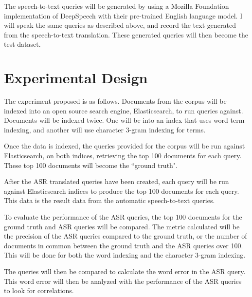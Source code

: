 \documentclass[jair, twoside,11pt,theapa]{article}
\begin{document}
The speech-to-text queries will be generated by using a Mozilla Foundation implementation of DeepSpeech \cite{mozilla} with their pre-trained English language model. I will speak the same queries as described above, and record the text generated from the speech-to-text translation. These generated queries will then become the test dataset. 

\section{Experimental Design}
The experiment proposed is as follows. Documents from the corpus will be indexed into an open source search engine, Elasticsearch, to run queries against. Documents will be indexed twice. One will be into an index that uses word term indexing, and another will use character 3-gram indexing for terms. 

Once the data is indexed, the queries provided for the corpus will be run against Elasticsearch, on both indices, retrieving the top 100 documents for each query. These top 100 documents will become the ``ground truth".

After the ASR translated queries have been created, each query will be run against Elasticsearch indices to produce the top 100 documents for each query. This data is the result data from the automatic speech-to-text queries. 

To evaluate the performance of the ASR queries, the top 100 documents for the ground truth and ASR queries will be compared. The metric calculated will be the precision of the ASR queries compared to the ground truth, or the number of documents in common between the ground truth and the ASR queries over 100. This will be done for both the word indexing and the character 3-gram indexing. 

The queries will then be compared to calculate the word error in the ASR query. This word error will then be analyzed with the performance of the ASR queries to look for correlations. 

\vskip 0.2in


\end{document}
